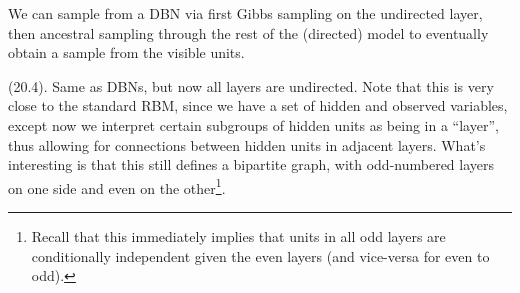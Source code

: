 \documentclass[11pt]{article}
\begin{document}
\begin{center}
\end{center}
We can sample from a DBN via first Gibbs sampling on the undirected layer, then ancestral sampling through the rest of the (directed) model to eventually obtain a sample from the visible units.

\myspace 
\p {} (20.4). Same as DBNs, but now all layers are undirected. Note that this is very close to the standard RBM, since we have a set of hidden and observed variables, except now we interpret certain subgroups of hidden units as being in a ``layer'', thus allowing for connections between hidden units in adjacent layers. What's interesting is that this still defines a bipartite graph, with odd-numbered layers on one side and even on the other\footnote{Recall that this immediately implies that units in all odd layers are conditionally independent given the even layers (and vice-versa for even to odd).}. \\
\end{document}
